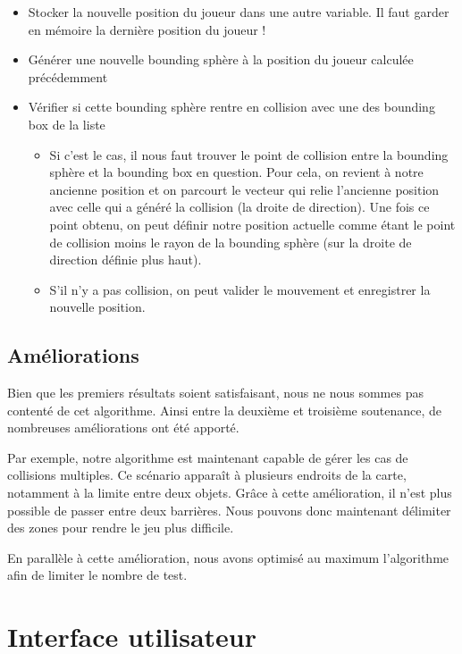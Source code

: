 \documentclass[11pt]{report}
\begin{document}
\begin{itemize}
\item Stocker la nouvelle position du joueur dans une autre variable. Il faut garder en mémoire la dernière position du joueur !
\item Générer une nouvelle bounding sphère à la position du joueur calculée précédemment
\item Vérifier si cette bounding sphère rentre en collision avec une des bounding box de la liste
\begin{itemize}
\item Si c'est le cas, il nous faut trouver le point de collision entre la bounding sphère et la bounding box en question. Pour cela, on revient à notre ancienne position et on parcourt le vecteur qui relie l'ancienne position avec celle qui a généré la collision (la droite de direction). Une fois ce point obtenu, on peut définir notre position actuelle comme étant le point de collision moins le rayon de la bounding sphère (sur la droite de direction définie plus haut).
\item S'il n'y a pas collision, on peut valider le mouvement et enregistrer la nouvelle position.
\end{itemize}
\end{itemize}

\section{Améliorations}

Bien que les premiers résultats soient satisfaisant, nous ne nous sommes pas contenté de cet algorithme. Ainsi entre la deuxième et troisième soutenance, de nombreuses améliorations ont été apporté. 

Par exemple, notre algorithme est maintenant capable de gérer les cas de collisions multiples. Ce scénario apparaît à plusieurs endroits de la carte, notamment à la limite entre deux objets. Grâce à cette amélioration, il n'est plus possible de passer entre deux barrières. Nous pouvons donc maintenant délimiter des zones pour rendre le jeu plus difficile.

En parallèle à cette amélioration, nous avons optimisé au maximum l'algorithme afin de limiter le nombre de test.

\chapter{Interface utilisateur}
\end{document}
